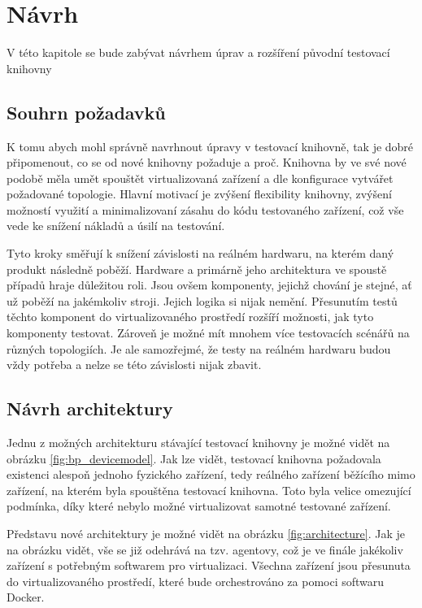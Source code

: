 \chapter{Návrh}\label{chap:design}

V této kapitole se bude zabývat návrhem úprav a rozšíření původní testovací knihovny


\section{Souhrn požadavků}

K tomu abych mohl správně navrhnout úpravy v testovací knihovně, tak je dobré připomenout, co se od nové knihovny požaduje a proč. Knihovna by ve své nové podobě měla umět spouštět virtualizovaná zařízení a dle konfigurace vytvářet požadované topologie. Hlavní motivací je zvýšení flexibility knihovny, zvýšení možností využití a minimalizovaní zásahu do kódu testovaného zařízení, což vše vede ke snížení nákladů a úsilí na testování.  

Tyto kroky směřují k snížení závislosti na reálném hardwaru, na kterém daný produkt následně poběží. Hardware a primárně jeho architektura ve spoustě případů hraje důležitou roli. Jsou ovšem komponenty, jejichž chování je stejné, ať už poběží na jakémkoliv stroji. Jejich logika si nijak nemění. Přesunutím testů těchto komponent do virtualizovaného prostředí rozšíří možnosti, jak tyto komponenty testovat. Zároveň je možné mít mnohem více testovacích scénářů na různých topologiích. Je ale samozřejmé, že testy na reálném hardwaru budou vždy potřeba a nelze se této závislosti nijak zbavit.


\section{Návrh architektury}

Jednu z možných architekturu stávající testovací knihovny je možné vidět na obrázku \ref{fig:bp_devicemodel}. Jak lze vidět, testovací knihovna požadovala existenci alespoň jednoho fyzického zařízení, tedy reálného zařízení běžícího mimo zařízení, na kterém byla spouštěna testovací knihovna. 
Toto byla velice omezující podmínka, díky které nebylo možné virtualizovat samotné testované zařízení.

Představu nové architektury je možné vidět na obrázku \ref{fig:architecture}. Jak je na obrázku vidět, vše se již odehrává na tzv. agentovy, což je ve finále jakékoliv zařízení s potřebným softwarem pro virtualizaci. Všechna zařízení jsou přesunuta do virtualizovaného prostředí, které bude orchestrováno za pomoci softwaru Docker. 

